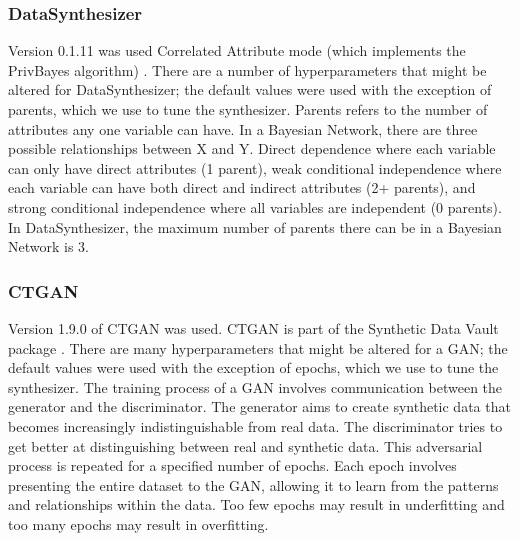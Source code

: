 \documentclass[runningheads]{llncs}
\begin{document}
\subsubsection{DataSynthesizer} Version  0.1.11 was used Correlated Attribute mode (which implements the PrivBayes \cite{zhang2017privbayes} algorithm) \cite{ping2017datasynthesizer}.  There are a number of hyperparameters that might be altered for DataSynthesizer; the default values were used with the exception of parents, which we use to tune the synthesizer.  Parents refers to the number of attributes any one variable can have.  In a Bayesian Network, there are three possible relationships between X and Y.  Direct dependence where each variable can only have direct attributes (1 parent), weak conditional independence where each variable can have both direct and indirect attributes (2+ parents), and strong conditional independence where all variables are independent (0 parents).  In DataSynthesizer, the maximum number of parents there can be in a Bayesian Network is 3.


\subsubsection{CTGAN} Version 1.9.0 of CTGAN was used.  CTGAN is part of the Synthetic Data Vault package \cite{patki2016synthetic}.  There are many hyperparameters that might be altered for a GAN; the default values were used with the exception of epochs, which we use to tune the synthesizer.  The training process of a GAN involves communication between the generator and the discriminator. The generator aims to create synthetic data that becomes increasingly indistinguishable from real data.  The discriminator tries to get better at distinguishing between real and synthetic data. This adversarial process is repeated for a specified number of epochs.  Each epoch involves presenting the entire dataset to the GAN, allowing it to learn from the patterns and relationships within the data. Too few epochs may result in underfitting and too many epochs may result in overfitting.
\end{document}

